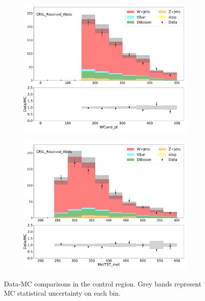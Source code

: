   \begin{figure}[htbp]
    \centering
     \begin{subfigure}{0.49\textwidth}
     \includegraphics[width = 0.98\textwidth]{Figures/4/datamc/CR1L_Resolved_WJets/WCand_pt.pdf}
     \caption{\Wcandpt}
     \end{subfigure}
     \begin{subfigure}{0.49\textwidth}
     \includegraphics[width = 0.98\textwidth]{Figures/4/datamc/CR1L_Resolved_WJets/MetTST_met.pdf}
     \caption{\met}
     \end{subfigure}

     \caption{Data-MC comparisons in the \resolved \wjets control region. Grey bands represent MC statistical uncertainty on each bin.}
     \label{fig:Data_MC_CRdR_resolved}
  \end{figure}


